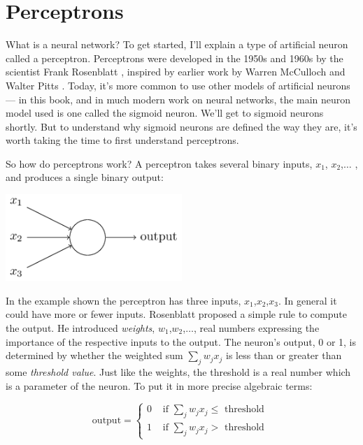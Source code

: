 \section{Perceptrons}

What is a neural network? To get started, I'll explain a type of artificial neuron called a perceptron. Perceptrons were developed in the 1950s and 1960s by the scientist Frank Rosenblatt \cite{rosenblatt1962principles}, inspired by earlier work by Warren McCulloch and Walter Pitts \cite{McCulloch1943}. Today, it's more common to use other models of artificial neurons --- in this book, and in much modern work on neural networks, the main neuron model used is one called the sigmoid neuron. We'll get to sigmoid neurons shortly. But to understand why sigmoid neurons are defined the way they are, it's worth taking the time to first understand perceptrons.

So how do perceptrons work? A perceptron takes several binary inputs, $x_1$, $x_2$,$\ldots$ , and produces a single binary output: 

{\centering
\includegraphics[width=0.5\textwidth,]{pic/simpleperceptron}
\par}

In the example shown the perceptron has three inputs, $x_1$,$x_2$,$x_3$. In general it could have more or fewer inputs. Rosenblatt proposed a simple rule to compute the output. He introduced \textit{weights}, $w_1$,$w_2$,$\ldots$, real numbers expressing the importance of the respective inputs to the output. The neuron's output, 0 or 1, is determined by whether the weighted sum $\sum_j w_j x_j$ is less than or greater than some \textit{threshold value}. Just like the weights, the threshold is a real number which is a parameter of the neuron. To put it in more precise algebraic terms: 

\begin{equation}
\textrm{output}=\left\{\begin{array}{ll}{0} & {\textrm { if } \sum_{j} w_{j} x_{j} \leq \textrm { threshold }} \\ {1} & {\textrm { if } \sum_{j} w_{j} x_{j}>\textrm { threshold }}
\end{array}\right.
\end{equation}

